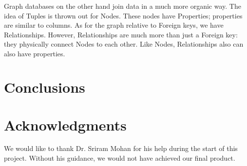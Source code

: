 \documentclass{acm_proc_article-sp}
\begin{document}
Graph databases on the other hand join data in a much more organic way. The idea of Tuples is thrown out for Nodes. These nodes have Properties; properties are similar to columns. As for the graph relative to Foreign keys, we have Relationships. However, Relationships are much more than just a Foreign key: they physically connect Nodes to each other. Like Nodes, Relationships also can also have properties.

\section{Conclusions}



\section{Acknowledgments}

We would like to thank Dr. Sriram Mohan for his help during the start of this project. Without his guidance, we would not have achieved our final product.

%

%
\end{document}
